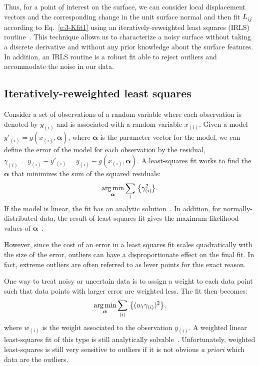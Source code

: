 Thus, for a point of interest on the surface, we can consider local displacement vectors and the corresponding change in the unit surface normal and then fit $\tensor{L}{_{ij}}$ according to Eq.~\ref{e:3-Kfit1} using an iteratively-reweighted least squares (IRLS) routine~\cite{RN32,RN31}.
This technique allows us to characterize a noisy surface without taking a discrete derivative and without any prior knowledge about the surface features.
In addition, an IRLS routine is a robust fit able to reject outliers and accommodate the noise in our data.


\subsection{Iteratively-reweighted least squares}
Consider a set of observations of a random variable where each observation is denoted by $y_{(i)}$ and is associated with a random variable $x_{(i)}$.
Given a model $y'_{(i)} = g(x_{(i)},\bm{\alpha})$, where $\bm{\alpha}$ is the parameter vector for the model, we can define the error of the model for each observation by the residual, $\gamma_{(i)} = y_{(i)} - y'_{(i)} = y_{(i)} - g(x_{(i)},\bm{\alpha})$.
A least-squares fit works to find the $\bm{\alpha}$ that minimizes the sum of the squared residuals:
\begin{equation}
  \operatorname*{arg\,min}_{\bm{\alpha}} \sum\limits_i\, \big \{ \gamma_{(i)}^2\big \}.\label{e:3-LeastSquare}
\end{equation}
If the model is linear, the fit has an analytic solution~\cite{RN269}.
In addition, for normally-distributed data, the result of least-squares fit gives the maximum-likelihood values of $\bm{\alpha}$~\cite{RN269}.

However, since the cost of an error in a least squares fit scales quadratically with the size of the error, outliers can have a disproportionate effect on the final fit.
In fact, extreme outliers are often referred to as lever points for this exact reason.

One way to treat noisy or uncertain data is to assign a weight to each data point such that data points with larger error are weighted less.
The fit then becomes:
\begin{equation}
  \operatorname*{arg\,min}_{\bm{\alpha}} \sum\limits_{(i)}\,\big \{ (w_i \gamma_{(i)})^2 \big \},
\end{equation}
where $w_{(i)}$ is the weight associated to the observation $y_{(i)}$.
A weighted linear least-squares fit of this type is still analytically solvable~\cite{RN269}.
Unfortunately, weighted least-squares is still very sensitive to outliers if it is not obvious \emph{a priori} which data are the outliers.

